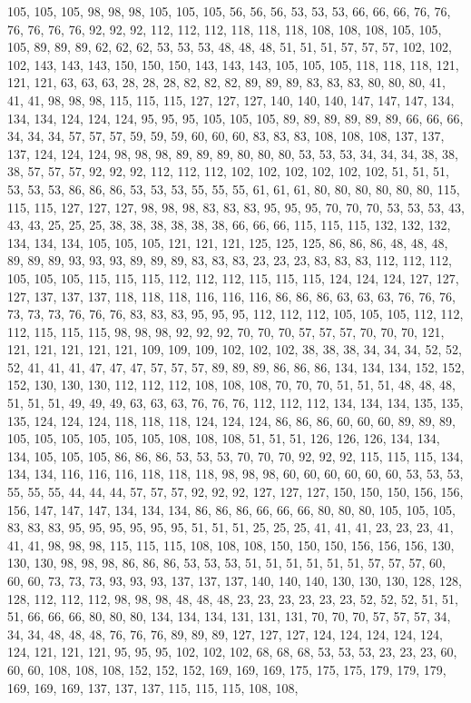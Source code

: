 105, 105, 105, 98, 98, 98, 105, 105, 105, 56, 56, 56, 53, 53, 53, 66, 66, 66, 76, 76, 76, 76, 76, 76, 92, 92, 92, 112, 112, 112, 118, 118, 118, 108, 108, 108, 105, 105, 105, 89, 89, 89, 62, 62, 62, 53, 53, 53, 48, 48, 48, 51, 51, 51, 57, 57, 57, 102, 102, 102, 143, 143, 143, 150, 150, 150, 143, 143, 143, 105, 105, 105, 118, 118, 118, 121, 121, 121, 63, 63, 63, 28, 28, 28, 82, 82, 82, 89, 89, 89, 83, 83, 83, 80, 80, 80, 41, 41, 41, 98, 98, 98, 115, 115, 115, 127, 127, 127, 140, 140, 140, 147, 147, 147, 134, 134, 134, 124, 124, 124, 95, 95, 95, 105, 105, 105, 89, 89, 89, 89, 89, 89, 66, 66, 66, 34, 34, 34, 57, 57, 57, 59, 59, 59, 60, 60, 60, 83, 83, 83, 108, 108, 108, 137, 137, 137, 124, 124, 124, 98, 98, 98, 89, 89, 89, 80, 80, 80, 53, 53, 53, 34, 34, 34, 38, 38, 38, 57, 57, 57, 92, 92, 92, 112, 112, 112, 102, 102, 102, 102, 102, 102, 51, 51, 51, 53, 53, 53, 86, 86, 86, 53, 53, 53, 55, 55, 55, 61, 61, 61, 80, 80, 80, 80, 80, 80, 115, 115, 115, 127, 127, 127, 98, 98, 98, 83, 83, 83, 95, 95, 95, 70, 70, 70, 53, 53, 53, 43, 43, 43, 25, 25, 25, 38, 38, 38, 38, 38, 38, 66, 66, 66, 115, 115, 115, 132, 132, 132, 134, 134, 134, 105, 105, 105, 121, 121, 121, 125, 125, 125, 86, 86, 86, 48, 48, 48, 89, 89, 89, 93, 93, 93, 89, 89, 89, 83, 83, 83, 23, 23, 23, 83, 83, 83, 112, 112, 112, 105, 105, 105, 115, 115, 115, 112, 112, 112, 115, 115, 115, 124, 124, 124, 127, 127, 127, 137, 137, 137, 118, 118, 118, 116, 116, 116, 86, 86, 86, 63, 63, 63, 76, 76, 76, 73, 73, 73, 76, 76, 76, 83, 83, 83, 95, 95, 95, 112, 112, 112, 105, 105, 105, 112, 112, 112, 115, 115, 115, 98, 98, 98, 92, 92, 92, 70, 70, 70, 57, 57, 57, 70, 70, 70, 121, 121, 121, 121, 121, 121, 109, 109, 109, 102, 102, 102, 38, 38, 38, 34, 34, 34, 52, 52, 52, 41, 41, 41, 47, 47, 47, 57, 57, 57, 89, 89, 89, 86, 86, 86, 134, 134, 134, 152, 152, 152, 130, 130, 130, 112, 112, 112, 108, 108, 108, 70, 70, 70, 51, 51, 51, 48, 48, 48, 51, 51, 51, 49, 49, 49, 63, 63, 63, 76, 76, 76, 112, 112, 112, 134, 134, 134, 135, 135, 135, 124, 124, 124, 118, 118, 118, 124, 124, 124, 86, 86, 86, 60, 60, 60, 89, 89, 89, 105, 105, 105, 105, 105, 105, 108, 108, 108, 51, 51, 51, 126, 126, 126, 134, 134, 134, 105, 105, 105, 86, 86, 86, 53, 53, 53, 70, 70, 70, 92, 92, 92, 115, 115, 115, 134, 134, 134, 116, 116, 116, 118, 118, 118, 98, 98, 98, 60, 60, 60, 60, 60, 60, 53, 53, 53, 55, 55, 55, 44, 44, 44, 57, 57, 57, 92, 92, 92, 127, 127, 127, 150, 150, 150, 156, 156, 156, 147, 147, 147, 134, 134, 134, 86, 86, 86, 66, 66, 66, 80, 80, 80, 105, 105, 105, 83, 83, 83, 95, 95, 95, 95, 95, 95, 51, 51, 51, 25, 25, 25, 41, 41, 41, 23, 23, 23, 41, 41, 41, 98, 98, 98, 115, 115, 115, 108, 108, 108, 150, 150, 150, 156, 156, 156, 130, 130, 130, 98, 98, 98, 86, 86, 86, 53, 53, 53, 51, 51, 51, 51, 51, 51, 57, 57, 57, 60, 60, 60, 73, 73, 73, 93, 93, 93, 137, 137, 137, 140, 140, 140, 130, 130, 130, 128, 128, 128, 112, 112, 112, 98, 98, 98, 48, 48, 48, 23, 23, 23, 23, 23, 23, 52, 52, 52, 51, 51, 51, 66, 66, 66, 80, 80, 80, 134, 134, 134, 131, 131, 131, 70, 70, 70, 57, 57, 57, 34, 34, 34, 48, 48, 48, 76, 76, 76, 89, 89, 89, 127, 127, 127, 124, 124, 124, 124, 124, 124, 121, 121, 121, 95, 95, 95, 102, 102, 102, 68, 68, 68, 53, 53, 53, 23, 23, 23, 60, 60, 60, 108, 108, 108, 152, 152, 152, 169, 169, 169, 175, 175, 175, 179, 179, 179, 169, 169, 169, 137, 137, 137, 115, 115, 115, 108, 108, 